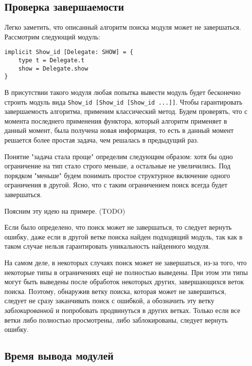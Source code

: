 \documentclass[../diploma.tex]{subfiles}
\begin{document}
\label{sec:2}

\subsection{Проверка завершаемости}\label{termination}

Легко заметить, что описанный алгоритм поиска модуля может не завершаться. Рассмотрим следующий модуль:

\begin{verbatim}
implicit Show_id [Delegate: SHOW] = {
    type t = Delegate.t
    show = Delegate.show
}
\end{verbatim}

В присутствии такого модуля любая попытка вывести модуль будет бесконечно строить модуль вида \texttt{Show_id [Show_id [Show_id ...]]}. Чтобы гарантировать завершаемость алгоритма, применим классический метод. Будем проверять, что с момента последнего применения функтора, который алгоритм применяет в данный момент, была получена новая информация, то есть в данный момент решается более простая задача, чем решалась в предыдущий раз.

Понятие "задача стала проще" определим следующим образом: хотя бы одно ограничение на тип стало строго меньше, а остальные не увеличились. Под порядком "меньше" будем понимать простое структурное включение одного ограничения в другой. Ясно, что с таким ограничением поиск всегда будет завершаться.

Поясним эту идею на примере. (TODO)

Если было определено, что поиск может не завершаться, то следует вернуть ошибку, даже если в другой ветке поиска найден подходящий модуль, так как в таком случае нельзя гарантировать уникальность найденного модуля.

На самом деле, в некоторых случаях поиск может не завершаться, из-за того, что некоторые типы в ограничениях ещё не полностью выведены. При этом эти типы могут быть выведены после обработок некоторых других, завершающихся веток поиска. Поэтому, обнаружив ветку поиска, которая может не завершиться, следует не сразу заканчивать поиск с ошибкой, а обозначить эту ветку \textit{заблокированной} и попробовать продвинуться в других ветках. Только если все ветки либо полностью просмотрены, либо заблокированы, следует вернуть ошибку.

\subsection{Время вывода модулей}\label{time}
\end{document}
